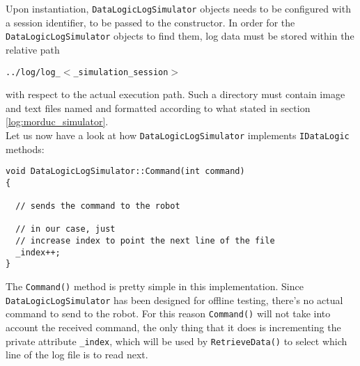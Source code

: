 Upon instantiation, \texttt{DataLogicLogSimulator} objects needs to be 
configured with a session identifier, to be passed to 
the constructor. 
In order for the \texttt{DataLogicLogSimulator} objects to find them, 
log data must be stored within the relative path 

\begin{center}
  \texttt{../log/log\_$<$\_simulation\_session$>$}
\end{center}

with respect to the actual execution path.
Such a directory must contain image and text files named and formatted
according to what stated in section \ref{log:morduc_simulator}. 
\\
Let us now have a look at how \texttt{DataLogicLogSimulator} implements 
\texttt{IDataLogic} methods:

\begin{lstlisting}[caption={\texttt{DataLogicLogSimulator::Command() method}},
    label={code:datalogiclogsimulator:command}, frame=trBL]
void DataLogicLogSimulator::Command(int command) 
{

  // sends the command to the robot

  // in our case, just 
  // increase index to point the next line of the file
  _index++;
}
\end{lstlisting}

The \texttt{Command()} method is pretty simple in this 
implementation. Since \texttt{DataLogicLogSimulator} has been designed 
for offline testing, there's no actual command to send to the robot.
For this reason \texttt{Command()} will not take into account
the received command, the only thing that it does is 
incrementing the private attribute \texttt{\_index}, which 
will be used by \texttt{RetrieveData()} to select which line 
of the log file is to read next.

